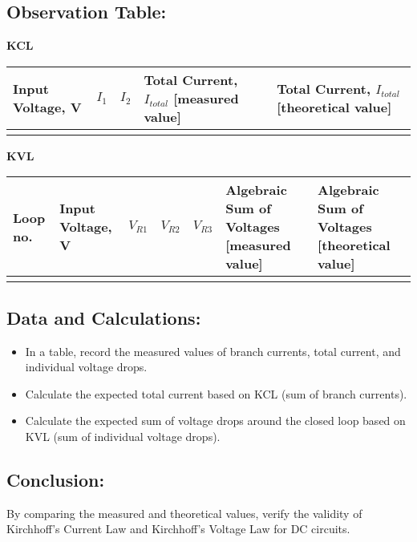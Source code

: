 \subsection*{Observation Table:}

\noindent \textbf{KCL}

\begin{table}[h]
    \centering
    \begin{tabular}{m{1.5 cm}|m{1.5 cm}|m{1.5 cm}|m{3.5 cm}|m{3.5 cm}}
        \hline
        Input Voltage, V & $I_1$ & $I_2$ & Total Current, $I_{total}$ [measured value] & Total Current, $I_{total}$ [theoretical value] \\
        \hline
         &   &  &  &  \\
        \hline

    \end{tabular}

    \label{tab:kcl}
\end{table}

\noindent \textbf{KVL}

\begin{table}[h]
    \centering
    \begin{tabular}{m{1.5 cm}|m{1.5 cm}|m{1.25 cm}|m{1.25 cm}|m{1.25 cm}|m{3 cm}|m{3 cm}}
        \hline
        Loop no. & Input Voltage, V & $V_{R1}$ & $V_{R2}$ & $V_{R3}$ & Algebraic Sum of Voltages [measured value] & Algebraic Sum of Voltages [theoretical value] \\
        \hline
         &   &  &  &  & \\
        \hline

    \end{tabular}
    \label{tab:kvl}
\end{table}

\subsection*{Data and Calculations:}

\begin{itemize}
    \item In a table, record the measured values of branch currents, total current, and individual voltage drops.
    \item Calculate the expected total current based on KCL (sum of branch currents).
    \item Calculate the expected sum of voltage drops around the closed loop based on KVL (sum of individual voltage drops).
\end{itemize}

\subsection*{Conclusion:}
By comparing the measured and theoretical values, verify the validity of Kirchhoff's Current Law and Kirchhoff's Voltage Law for DC circuits.

\newpage 